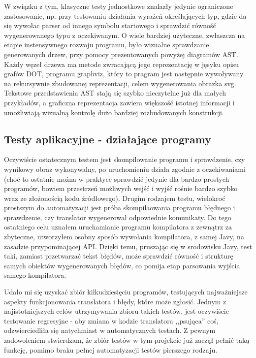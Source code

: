 W związku z tym, klasyczne testy jednostkowe znalazły jedynie ograniczone zastosowanie, np. przy testowaniu działania wyrażeń określających typ, gdzie da się wywołac parser od innego symbolu startowego i sprawdzić równość wygenerowanego typu z oczekiwanym. O wiele bardziej użyteczne, zwłaszcza na etapie instensywnego rozwoju programu, było wizualne sprawdzanie generowanych drzew, przy pomocy prezentowanych powyżej diagramów AST. Każdy węzeł drzewa ma metode zwracającą jego reprezentację w jęsyku opisu grafów DOT, programu graphviz, który to pragram jest następnie wywoływany na rekursywnie zbudowanej reprezentacji, celem wygenerowania obrazka svg. Tekstowe przedstawienia AST stają się szybko nieczytelne już dla małych przykładów, a graficzna reprezentacja zawiera większość istotnej informacji i umożliwiają wizualną kontrolę dużo bardziej rozbudowanych konstrukcji.

\subsection{Testy aplikacyjne - działające programy}
Oczywiście ostatecznym testem jest skompilowanie programu i sprawdzenie, czy wynikowy obraz wykonywalny, po uruchomieniu działa zgodnie z oczekiwaniami (choć to ostatnie można w praktyce sprawdzić jedynie dla bardzo prostych programów, bowiem przestrzeń możliwych wejść i wyjść rośnie bardzo szybko wraz ze złożonością kodu źródłowego). Drugim rodzajem testu, wielokroć prostszym do automatyzacji jest próba skompilaowania programu błędnego i sprawdzenie, czy translator wygenerował odpowiednie komunikaty.
Do tego ostatniego celu uznałem uruchamianie programu kompilatora z zewnątrz za zbyteczne, utworzyłem osobny sposób wywołania kompilatora, z samej Javy, na zasadzie przypominającej API. Dzięki temu, pruszając się w srodowisku Javy, test taki, zamiast przetwarzać tekst błędów, może sprawdzić równość i strukturę samych obiektów wygenerowanych błędów, co pomija etap parsowania wyjścia samego kompilatora.

Udało mi się uzyskać zbiór kilkudziesięciu programów, testujących najważniejsze aspekty funkcjonowania translatora i błędy, które może zgłosić. Jednym z najistotniejszych celów utrzymywania zbioru takich testów, jest oczywiście testowanie regresyjne - aby zmiana w kodzie translatora ,,psująca'' coś, odzwierciedliła się natychmiast w automatycznych testach. Z pewnym zadowoleniem stwierdzam, że zbiór testów w tym projekcie już zaczął pełnić taką funkcję, pomimo braku pełnej automatyzacji testów pierszego rodzaju.
